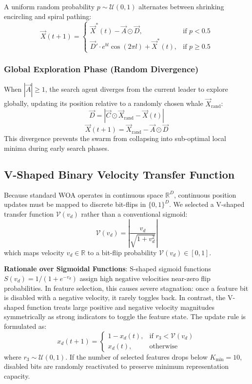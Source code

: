 \documentclass[conference]{IEEEtran}
\begin{document}
A uniform random probability $p \sim \mathcal{U}(0, 1)$ alternates between shrinking encircling and spiral pathing:
\begin{equation}
\vec{X}(t+1) = \begin{cases} 
\vec{X}^*(t) - \vec{A} \odot \vec{D}, & \text{if } p < 0.5 \\ 
\vec{D}' \cdot e^{bl} \cos(2\pi l) + \vec{X}^*(t), & \text{if } p \ge 0.5 
\end{cases}
\end{equation}

\subsubsection{Global Exploration Phase (Random Divergence)}
When $|\vec{A}| \ge 1$, the search agent diverges from the current leader to explore globally, updating its position relative to a randomly chosen whale $\vec{X}_{\text{rand}}$:
\begin{equation}
\vec{D} = \left| \vec{C} \odot \vec{X}_{\text{rand}} - \vec{X}(t) \right|
\end{equation}
\begin{equation}
\vec{X}(t+1) = \vec{X}_{\text{rand}} - \vec{A} \odot \vec{D}
\end{equation}
This divergence prevents the swarm from collapsing into sub-optimal local minima during early search phases.

\subsection{V-Shaped Binary Velocity Transfer Function}
Because standard WOA operates in continuous space $\mathbb{R}^D$, continuous position updates must be mapped to discrete bit-flips in $\{0, 1\}^D$. We selected a V-shaped transfer function $\mathcal{V}(v_d)$ rather than a conventional sigmoid:
\begin{equation}
\mathcal{V}(v_d) = \left| \frac{v_d}{\sqrt{1 + v_d^2}} \right|
\end{equation}
which maps velocity $v_d \in \mathbb{R}$ to a bit-flip probability $\mathcal{V}(v_d) \in [0, 1]$.

\textbf{Rationale over Sigmoidal Functions}: S-shaped sigmoid functions $S(v_d) = 1 / (1 + e^{-v_d})$ assign high negative velocities near-zero flip probabilities. In feature selection, this causes severe stagnation: once a feature bit is disabled with a negative velocity, it rarely toggles back. In contrast, the V-shaped function treats large positive and negative velocity magnitudes symmetrically as strong indicators to toggle the feature state. The update rule is formulated as:
\begin{equation}
x_d(t+1) = \begin{cases} 
1 - x_d(t), & \text{if } r_3 < \mathcal{V}(v_d) \\ 
x_d(t), & \text{otherwise} 
\end{cases}
\end{equation}
where $r_3 \sim \mathcal{U}(0, 1)$. If the number of selected features drops below $K_{\text{min}} = 10$, disabled bits are randomly reactivated to preserve minimum representation capacity.
\end{document}
